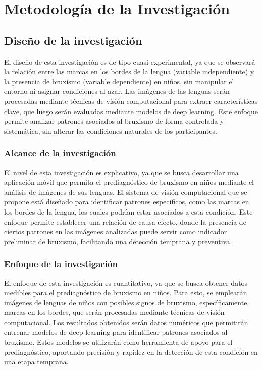 \chapter{Metodología de la Investigación}
\section{Diseño de la investigación}
El diseño de esta investigación es de tipo cuasi-experimental, ya que se observará la relación entre las marcas en los bordes de la lengua (variable independiente) y la presencia de bruxismo (variable dependiente) en niños, sin manipular el entorno ni asignar condiciones al azar. Las imágenes de las lenguas serán procesadas mediante técnicas de visión computacional para extraer características clave, que luego serán evaluadas mediante modelos de deep learning. Este enfoque permite analizar patrones asociados al bruxismo de forma controlada y sistemática, sin alterar las condiciones naturales de los participantes.

\subsection{Alcance de la investigación}
El nivel de esta investigación es explicativo, ya que se busca desarrollar una aplicación móvil que permita el prediagnóstico de bruxismo en niños mediante el análisis de imágenes de sus lenguas. El sistema de visión computacional que se propone está diseñado para identificar patrones específicos, como las marcas en los bordes de la lengua, los cuales podrían estar asociados a esta condición. Este enfoque permite establecer una relación de causa-efecto, donde la presencia de ciertos patrones en las imágenes analizadas puede servir como indicador preliminar de bruxismo, facilitando una detección temprana y preventiva.

\subsection{Enfoque de la investigación}
El enfoque de esta investigación es cuantitativo, ya que se busca obtener datos medibles para el prediagnóstico de bruxismo en niños. Para esto, se emplearán imágenes de lenguas de niños con posibles signos de bruxismo, específicamente marcas en los bordes, que serán procesadas mediante técnicas de visión computacional. Los resultados obtenidos serán datos numéricos que permitirán entrenar modelos de deep learning para identificar patrones asociados al bruxismo. Estos modelos se utilizarán como herramienta de apoyo para el prediagnóstico, aportando precisión y rapidez en la detección de esta condición en una etapa temprana.

